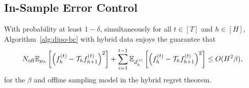 \subsection{In-Sample Error Control}

\begin{lem}
With probability at least $1-\delta$, simultaneously for all $t\in[T]$ and $h\in[H]$, Algorithm~\ref{alg:dipo-bc} with hybrid data enjoys the guarantee that
    $$N_{{\operatorname{off}}} \mathbb{E}_{\mu_h}\left[\left(f_h^{(t)} - {\mathcal{T}}_h f_{h+1}^{(t)}\right)^2\right] + \sum_{i=1}^{t-1} \mathbb{E}_{d_h^{(i)}}\left[\left(f_h^{(t)} - {\mathcal{T}}_h f_{h+1}^{(t)}\right)^2\right] \leq O(H^2\beta),$$
    for the $\beta$ and offline sampling model in the hybrid regret theorem.
    \label{lem:in-sample-error-control-hybrid-dipo}
\end{lem}
